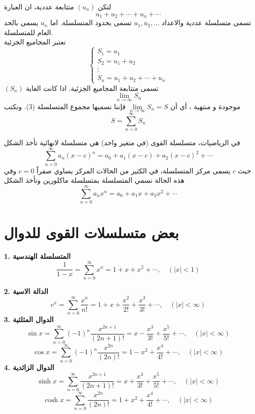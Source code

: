 \begin{definition}
	لتكن $(u_n)$ متتابعة عددية، ان العبارة
	\begin{equation}
		u_1 + u_2 + \cdots + u_n + \cdots
	\end{equation}
	تسمى متسلسلة عددية والاعداد $u_1,u_2,\dots$ تسمى بحدود المتسلسلة. اما $u_n$ يسمى بالحد العام للمتسلسلة.\\
	نعتبر المجاميع الجزئية
	\[
	\left\{
	\begin{array}{l}
		S_1 = u_1\\
		S_2 = u_1+u_2\\
		\vdots\\
		S_n = u_1 + u_2 + \cdots + u_n
	\end{array}
	\right.
	\]
	$(S_n)$ تسمى متتابعة المجاميع الجزئية. اذا كانت الغاية
	\begin{equation}
		\lim\limits_{n\to \infty} S_n
	\end{equation}
	موجودة و منتهية ، أي أن $\lim\limits_{n\to \infty} S_n = S$ فإننا نسميها مجموع المتسلسلة (3). ونكتب
	\begin{equation}
		S = \sum_{n=0}^{\infty} S_n
	\end{equation}
\end{definition}

\begin{definition}
	في الرياضيات، متسلسلة القوى (في متغير واحد) هي متسلسلة لانهائية تأخذ الشكل
	\begin{equation}
		\sum_{n=0}^{\infty} a_n (x-c)^n = a_0 + a_1(x-c) + a_2 (x-c)^2  + \cdots
	\end{equation}
	حيث $c$ يسمى مركز المتسلسلة، في الكثير من الحالات المركز يساوي صفراً $c=0$ وفي هذه الحالة نسمي المتسلسلة بمتسلسلة ماكلورين وتأخذ الشكل
	\begin{equation}
		\sum_{n=0}^{\infty} a_n x^n = a_0 + a_1 x + a_2 x^2 + \cdots
	\end{equation}
\end{definition}

\section{بعض متسلسلات القوى للدوال}
\textbf{1. المتسلسلة الهندسية}
\[
\frac{1}{1-x} = \sum_{n=0}^{\infty} x^n = 1+x+x^2 + \cdots, \quad (|x| < 1)
\]

\noindent
\textbf{2. الدالة الاسية}
\[
e^x = \sum_{n=0}^{\infty} \frac{x^n }{n!} = 1 + x + \frac{x^2}{2!} +  \frac{x^3}{3!}+ \cdots , \quad (|x| < \infty)
\]
\textbf{3. الدوال المثلثية}
\[
\sin x = \sum_{n=0}^{\infty} (-1)^n \frac{x^{2n+1}}{(2n+1)!} = x - \frac{x^3}{3!} + \frac{x^5}{5!} + \cdots, \quad (|x|<\infty)
\]
\[
\cos x = \sum_{n=0}^{\infty} (-1)^n \frac{x^{2n}}{(2n)!} = 1- x^2 + \frac{x^4 }{4!} + \cdots, \quad (|x| < \infty)
\]
\textbf{4. الدوال الزائدية}
\[
\sinh x = \sum_{n=0}^{\infty} \frac{x^{2n+1}}{(2n+1)!} = x + \frac{x^3}{3!} + \frac{x^5}{5!} + \cdots, \quad (|x|<\infty)
\]
\[
\cosh x = \sum_{n=0}^{\infty} \frac{x^{2n}}{(2n)!} = 1+ x^2 + \frac{x^4 }{4!} + \cdots, \quad (|x| < \infty)
\]